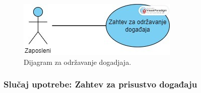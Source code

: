 \documentclass[a4paper]{article}
\begin{document}
\begin{figure} [!ht]
    \begin{center}
        \includegraphics[scale=0.5]{Korisnici/Udruzenje/UML/SlucajUpotrebe_OdrzavanjeDogadjaja.jpeg}
    \end{center}
\caption{Dijagram za održavanje dogadjaja.}
\end{figure}

\newpage
\subsubsection{Slučaj upotrebe: Zahtev za prisustvo događaju}
\end{document}
